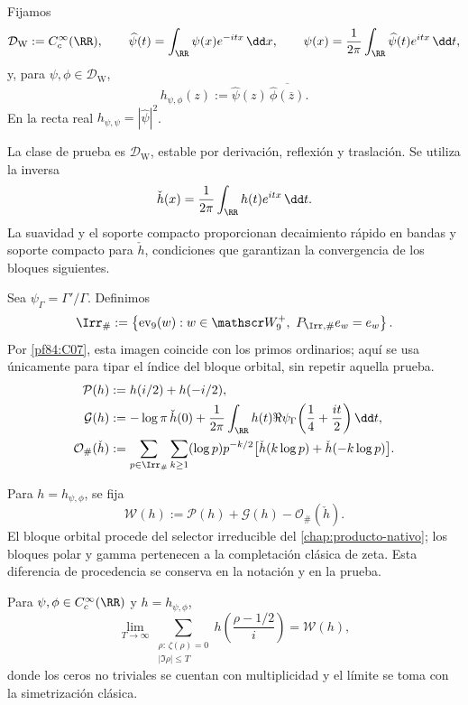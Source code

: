 Fijamos
\[
 \mathcal D_{\mathrm W}:=C_c^\infty(\RR),
 \qquad
 \widehat\psi(t)=\int_{\RR}\psi(x)e^{-itx}\,\dd x,
 \qquad
 \psi(x)=\frac1{2\pi}\int_{\RR}\widehat\psi(t)e^{itx}\,\dd t,
\]
y, para \(\psi,\phi\in\mathcal D_{\mathrm W}\),
\[
 h_{\psi,\phi}(z)
 :=\widehat\psi(z)\,
 \overline{\widehat\phi(\overline z)}.
\]
En la recta real \(h_{\psi,\psi}=|\widehat\psi|^2\).

\begin{definition}
\label{pf84:E01}
La clase de prueba es \(\mathcal D_{\mathrm W}\), estable por derivación,
reflexión y traslación. Se utiliza la inversa
\[
 \check h(x)=\frac1{2\pi}\int_{\RR}h(t)e^{itx}\,\dd t.
\]
La suavidad y el soporte compacto proporcionan decaimiento rápido en bandas
y soporte compacto para \(\check h\), condiciones que garantizan la
convergencia de los bloques siguientes.
\end{definition}

Sea \(\psi_\Gamma=\Gamma'/\Gamma\). Definimos
\[
 \Irr_\#:=
 \left\{\operatorname{ev}_9(w):
 w\in\mathscr W_9^+,\ 
 P_{\Irr,\#}e_w=e_w\right\}.
\]
Por \cref{pf84:C07}, esta imagen coincide con los primos ordinarios; aquí se
usa únicamente para tipar el índice del bloque orbital, sin repetir aquella
prueba.
\begin{align}
 \mathcal P(h)&:=h(i/2)+h(-i/2),\\
 \mathcal G(h)&:=-\log\pi\,\check h(0)
 +\frac1{2\pi}\int_{\RR}h(t)
 \Re\psi_\Gamma\!\left(\frac14+\frac{it}{2}\right)\dd t,\\
 \mathcal O_\#(\check h)&:=
 \sum_{p\in\Irr_\#}\sum_{k\ge1}
 (\log p)p^{-k/2}
 \bigl[\check h(k\log p)+\check h(-k\log p)\bigr].
\end{align}

\begin{definition}
\label{pf84:E02}
Para \(h=h_{\psi,\phi}\), se fija
\[
 \mathcal W(h):=\mathcal P(h)+\mathcal G(h)
 -\mathcal O_\#(\check h).
\]
El bloque orbital procede del selector irreducible del
\cref{chap:producto-nativo}; los bloques polar y gamma pertenecen a la
completación clásica de zeta. Esta diferencia de procedencia se conserva en
la notación y en la prueba.
\end{definition}

\begin{theorem}
\label{pf84:E03}
Para \(\psi,\phi\in C_c^\infty(\RR)\) y \(h=h_{\psi,\phi}\),
\[
 \lim_{T\to\infty}
 \sum_{\substack{\rho:\,\zeta(\rho)=0\\|\Im\rho|\le T}}
 h\!\left(\frac{\rho-1/2}{i}\right)
 =\mathcal W(h),
\]
donde los ceros no triviales se cuentan con multiplicidad y el límite se
toma con la simetrización clásica.
\end{theorem}

